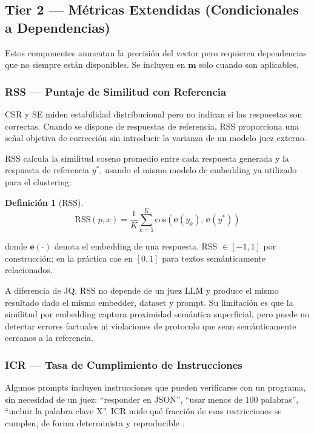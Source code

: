 \documentclass[11pt,a4paper]{article}
\newtheorem{definition}{Definición}
\begin{document}
\subsection{Tier 2 --- Métricas Extendidas (Condicionales a Dependencias)}

Estos componentes aumentan la precisión del vector pero requieren dependencias que no siempre están disponibles. Se incluyen en $\mathbf{m}$ solo cuando son aplicables.

\subsubsection{RSS --- Puntaje de Similitud con Referencia}

CSR y SE miden estabilidad distribucional pero no indican si las respuestas son correctas. Cuando se dispone de respuestas de referencia, RSS proporciona una señal objetiva de corrección sin introducir la varianza de un modelo juez externo.

RSS calcula la similitud coseno promedio entre cada respuesta generada y la respuesta de referencia $y^*$, usando el mismo modelo de embedding ya utilizado para el clustering:

\begin{definition}[RSS]
\[
\mathrm{RSS}(p, x) = \frac{1}{K} \sum_{k=1}^{K} \mathrm{cos}\!\left(\mathbf{e}(y_k),\, \mathbf{e}(y^*)\right)
\]
\end{definition}

\noindent donde $\mathbf{e}(\cdot)$ denota el embedding de una respuesta. RSS $\in [-1, 1]$ por construcción; en la práctica cae en $[0, 1]$ para textos semánticamente relacionados.

A diferencia de JQ, RSS no depende de un juez LLM y produce el mismo resultado dado el mismo embedder, dataset y prompt. Su limitación es que la similitud por embedding captura proximidad semántica superficial, pero puede no detectar errores factuales ni violaciones de protocolo que sean semánticamente cercanos a la referencia.

\subsubsection{ICR --- Tasa de Cumplimiento de Instrucciones}

Algunos prompts incluyen instrucciones que pueden verificarse con un programa, sin necesidad de un juez: ``responder en JSON'', ``usar menos de 100 palabras'', ``incluir la palabra clave X''. ICR mide qué fracción de esas restricciones se cumplen, de forma determinista y reproducible \citep{ifeval2023}.
\end{document}
